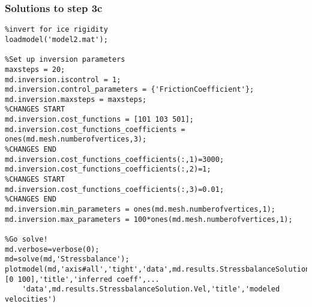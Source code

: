 \subsubsection{Solutions to step 3c}
\begin{verbatim}%invert for ice rigidity
loadmodel('model2.mat');

%Set up inversion parameters
maxsteps = 20;
md.inversion.iscontrol = 1;
md.inversion.control_parameters = {'FrictionCoefficient'};
md.inversion.maxsteps = maxsteps;
%CHANGES START
md.inversion.cost_functions = [101 103 501];
md.inversion.cost_functions_coefficients = ones(md.mesh.numberofvertices,3);
%CHANGES END
md.inversion.cost_functions_coefficients(:,1)=3000;
md.inversion.cost_functions_coefficients(:,2)=1;
%CHANGES START
md.inversion.cost_functions_coefficients(:,3)=0.01;
%CHANGES END
md.inversion.min_parameters = ones(md.mesh.numberofvertices,1);
md.inversion.max_parameters = 100*ones(md.mesh.numberofvertices,1);

%Go solve!
md.verbose=verbose(0);
md=solve(md,'Stressbalance');
plotmodel(md,'axis#all','tight','data',md.results.StressbalanceSolution.FrictionCoefficient,'caxis',[0 100],'title','inferred coeff',...
	'data',md.results.StressbalanceSolution.Vel,'title','modeled velocities')\end{verbatim}
